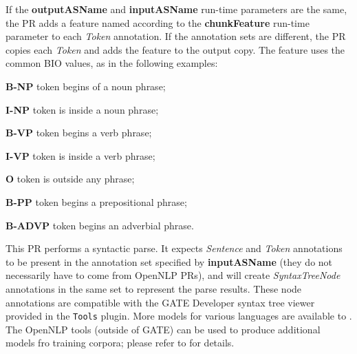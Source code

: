 If the \textbf{outputASName} and \textbf{inputASName} run-time parameters are
the same, the PR adds a feature named according to the \textbf{chunkFeature}
run-time parameter to each \emph{Token} annotation.  If the annotation sets are
different, the PR copies each \emph{Token} and adds the feature to the output
copy.  The feature uses the common BIO values, as in the following examples:
\begin{description}
\item\textbf{B-NP} token begins of a noun phrase;
\item\textbf{I-NP} token is inside a noun phrase;
\item\textbf{B-VP} token begins a verb phrase;
\item\textbf{I-VP} token is inside a verb phrase;
\item\textbf{O} token is outside any phrase;
\item\textbf{B-PP} token begins a  prepositional phrase;
\item\textbf{B-ADVP} token begins an adverbial phrase.
\end{description}
This PR performs a syntactic parse.  It expects
\emph{Sentence} and \emph{Token} annotations to be present in
the annotation set specified by \textbf{inputASName} (they do not necessarily
have to come from OpenNLP PRs), and will create \emph{SyntaxTreeNode}
annotations in the same set to represent the parse results.  These node
annotations are compatible with the GATE Developer syntax tree viewer provided
in the \verb!Tools! plugin.
More models for various languages are available to
.
The OpenNLP tools (outside of GATE) can be used to produce additional models fro
training corpora; please refer to
 for
details.


